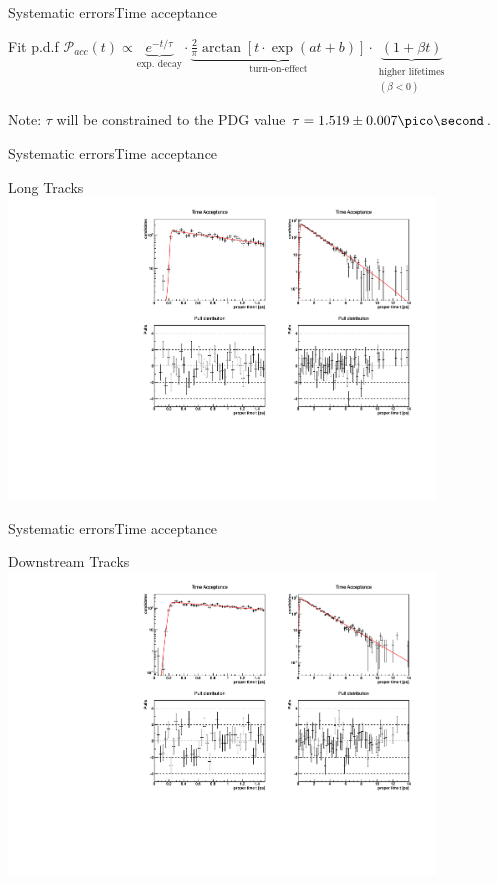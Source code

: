 \documentclass{beamer}
\begin{document}
\begin{frame}{Systematic errors}{Time acceptance}
    \begin{block}{Fit p.d.f}
    $\mathcal{P}_{acc}(t) \propto \underbrace{e^{-t/\tau}}_{\text{exp. decay}} \cdot \underbrace{\frac{2}{\pi}\arctan[t\cdot \exp(at+b)]}_{\text{turn-on-effect}} \cdot \underbrace{(1 + \beta t)}_{\substack{\text{higher lifetimes} \\(\beta<0)}}$
    \end{block}
    \begin{alert}{Note:}
    $\tau$ will be constrained to the PDG value $\tau = 1.519 \pm 0.007 \pico\second$.
    \end{alert}
\end{frame}

\begin{frame}{Systematic errors}{Time acceptance}
\begin{block}{Long Tracks}
\centering
\includegraphics[width=0.85\textwidth]{time_acceptance_fit_lt}
\end{block}
\end{frame}

\begin{frame}{Systematic errors}{Time acceptance}
\begin{block}{Downstream Tracks}
\centering
\includegraphics[width=0.85\textwidth]{time_acceptance_fit_ds}
\end{block}
\end{frame}
\end{document}
